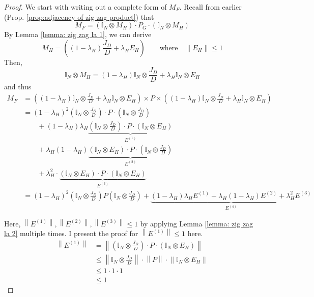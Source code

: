 \documentclass[11pt, letter]{book}
\newcommand{\norm}[1]{\left\lVert#1\right\rVert}
\begin{document}
\begin{proof}
	We start with writing out a complete form of $M_F$. Recall from earlier (Prop. \ref{prop:adjacency of zig zag product}) that 
	\begin{equation}
		M_F = (\mathbb I _N \otimes M_H ) \cdot P_G \cdot ( \mathbb I _ N \otimes M_H )
	\end{equation}
	By Lemma \ref{lemma: zig zag la 1}, we can derive
	\begin{equation}
		M_H = \left( ( 1- \lambda_H ) \frac{J_D}{D} + \lambda_H E_H \right) \quad\quad \text{where} \quad \norm{E_H} \leq 1
	\end{equation}
	Then, 
	\begin{equation}
		\mathbb I _ N \otimes M_H = ( 1- \lambda_H) \mathbb I _N \otimes \frac{J_D}{D} + \lambda_H \mathbb I_N \otimes E_H
	\end{equation}
	and thus
	\begin{align}
		M_F 
		&= \left(
			(1 - \lambda_H) \mathbb I_N \otimes \frac{J_D}{D} + \lambda_H \mathbb I_N \otimes E_H
		\right) \times P \times \left( 
			(1 - \lambda_H) \mathbb I_N \otimes \frac{J_D}{D} + \lambda_H \mathbb I_N \otimes E_H
		\right) \\
		&= ( 1- \lambda_H )^2 \left( \mathbb I _N \otimes \frac{J_D}{D} \right) \cdot P \cdot \left( \mathbb I _N \otimes \frac{J_D}{D} \right) \\
		& \quad \quad + (1 - \lambda_H) \lambda_H \underbrace{\left( \mathbb I _N \otimes \frac{J_D}{D} \right) \cdot P \cdot ( \mathbb I _N \otimes E_H )}_{E^{(1)}} \\
		& \quad \quad + \lambda_H ( 1-\lambda_H) \underbrace{(\mathbb I _N \otimes E_H ) \cdot P \cdot \left( \mathbb I _N \otimes \frac{J_D}{D} \right)}_{E^{(2)}}  \\
		& \quad \quad + \lambda_H^2 \cdot \underbrace{(\mathbb I _N \otimes E_H ) \cdot P \cdot (\mathbb I _N \otimes E_H )} _{E^{(3)}} \\
		&= ( 1- \lambda_H )^2 \left( \mathbb I _N \otimes \frac{J_D}{D} \right) P \left( \mathbb I _N \otimes \frac{J_D}{D} \right) + \underbrace{(1 - \lambda_H)\lambda_H E^{(1)} + \lambda_H(1 - \lambda_H) E^{(2)} + \lambda_H^2 E^{(3)}}_{E^{(4)}} \label{eq:zig zag expanded M_F}
	\end{align}
	
	Here, $\norm {E^{(1)}}, \norm {E^{(2)}}, \norm {E^{(3)}} \leq 1$ by applying Lemma \ref{lemma: zig zag la 2} multiple times. I present the proof for $\norm{E^{(1)}} \leq 1$ here.
 	\begin{align}
		\norm{E^{(1)}}
		&= \norm{ \left( \mathbb I _N \otimes \frac{J_D}{D} \right) \cdot P \cdot ( \mathbb I _N \otimes E_H ) } \\
		&\leq \norm{\mathbb I _N \otimes \frac{J_D}{D}} \cdot \norm{P} \cdot \norm{ \mathbb I _N \otimes E_H} \\
		&\leq 1 \cdot 1 \cdot 1 \\
		&\leq 1
	\end{align}
	

\end{proof}
\end{document}
